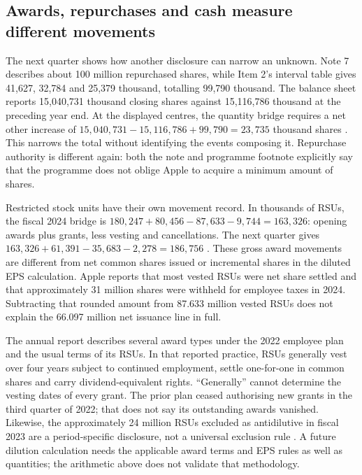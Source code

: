 \subsection{Awards, repurchases and cash measure different movements}

The next quarter shows how another disclosure can narrow an unknown. Note 7
describes about 100 million repurchased shares, while Item 2's interval table
gives 41,627, 32,784 and 25,379 thousand, totalling 99,790 thousand. The balance
sheet reports 15,040,731 thousand closing shares against 15,116,786 thousand
at the preceding year end. At the displayed centres, the quantity bridge requires a net
other increase of $15{,}040{,}731-15{,}116{,}786+99{,}790=23{,}735$ thousand
shares \citep[printed pp.~3, 10 and 20]{apple2025q1}. This narrows the total
without identifying the events composing it. Repurchase authority is different
again: both the note and programme footnote explicitly say that the programme
does not oblige Apple to acquire a minimum amount of shares.

Restricted stock units have their own movement record. In thousands of RSUs,
the fiscal 2024 bridge is $180{,}247+80{,}456-87{,}633-9{,}744=163{,}326$:
opening awards plus grants, less vesting and cancellations. The next quarter
gives $163{,}326+61{,}391-35{,}683-2{,}278=186{,}756$
\citep[Note 11, printed pp.~44--45]{apple2024}
\citep[Note 8, printed p.~10]{apple2025q1}. These gross award movements are
different from net common shares issued or incremental shares in the diluted
EPS calculation. Apple reports that most vested RSUs were net share settled
and that approximately 31 million shares were withheld for employee taxes in
2024. Subtracting that rounded amount from 87.633 million vested RSUs does
not explain the 66.097 million net issuance line in full.

The annual report describes several award types under the 2022 employee
plan and the usual terms of its RSUs. In that reported practice, RSUs generally vest
over four years subject to continued employment, settle one-for-one in common
shares and carry dividend-equivalent rights. ``Generally'' cannot determine
the vesting dates of every grant. The prior plan ceased authorising new grants
in the third quarter of 2022; that does not say its outstanding awards vanished.
Likewise, the approximately 24 million RSUs excluded as antidilutive in fiscal
2023 are a period-specific disclosure, not a universal exclusion rule
\citep[Notes 3 and 11, printed pp.~36 and 44--45]{apple2024}. A future dilution
calculation needs the applicable award terms and EPS rules as well as quantities;
the arithmetic above does not validate that methodology.

